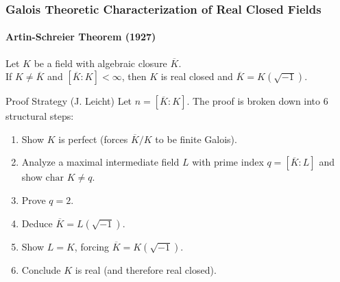\documentclass[11pt]{beamer}
\begin{document}
\begin{frame}
    \frametitle{Galois Theoretic Characterization of Real Closed Fields}
    \framesubtitle{Artin-Schreier Theorem (1927)}

    \vspace{-0.4em}
    \begin{theorem}
        Let $K$ be a field with algebraic closure $\overline{K}$.\\
        If $K \neq \overline{K}$ and $[\overline{K} : K] < \infty$, then $K$ is real closed and $\overline{K} = K(\sqrt{-1})$.
    \end{theorem}
    \vspace{-0.4em}
    \begin{block}{Proof Strategy (J. Leicht)}
        Let $n = [\overline{K}:K]$. The proof is broken down into 6 structural steps:
        \begin{enumerate}
            \setlength{\itemsep}{0.3em}
            \item Show $K$ is perfect (forces $\overline{K}/K$ to be finite Galois).
            \item Analyze a maximal intermediate field $L$ with prime index $q = [\overline{K}:L]$ and show $\text{char } K \neq q$.
            \item Prove $q = 2$.
            \item Deduce $\overline{K} = L(\sqrt{-1})$.
            \item Show $L = K$, forcing $\overline{K} = K(\sqrt{-1})$.
            \item Conclude $K$ is real (and therefore real closed).
        \end{enumerate}
    \end{block}
\end{frame}
\end{document}
